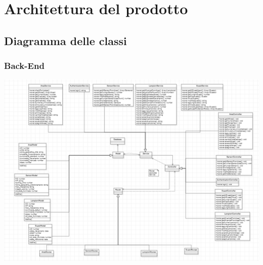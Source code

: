 \documentclass[12pt]{article}
\begin{document}
\section{Architettura del prodotto}

\subsection{Diagramma delle classi}
\subsubsection{Back-End}
\includegraphics[width=475pt]{Back-End.png}
\clearpage
\end{document}
